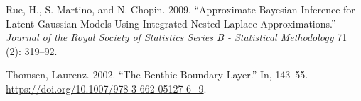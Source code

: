 \documentclass[a4paper]{article}
\begin{document}
\leavevmode\hypertarget{ref-Rue-2009-319}{}%
Rue, H., S. Martino, and N. Chopin. 2009. ``Approximate Bayesian
Inference for Latent Gaussian Models Using Integrated Nested Laplace
Approximations.'' \emph{Journal of the Royal Society of Statistics
Series B - Statistical Methodology} 71 (2): 319--92.

\leavevmode\hypertarget{ref-Thomsen-2002-2002}{}%
Thomsen, Laurenz. 2002. ``The Benthic Boundary Layer.'' In, 143--55.
\url{https://doi.org/10.1007/978-3-662-05127-6_9}.
%


\end{document}
